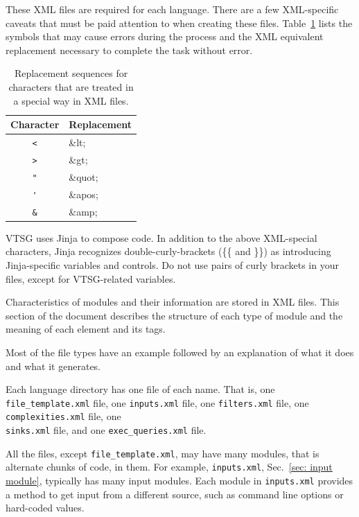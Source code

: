 These XML files are required for each language.
There 
are a few XML-specific caveats that must be paid attention to when 
creating these files. 
Table~\ref{tab:XML escapes} lists the symbols that may cause errors 
during the process and the XML equivalent replacement necessary to 
complete the
task without error.

\begin{table}[H]
\centering
\caption{Replacement sequences for characters that are treated 
in a special way in XML files.}
\begin{tabular}{|c|l|}
\hline
\textbf{Character} & \textbf{Replacement} \\
\hline
 \verb|<| & \&lt; \\
\hline
 \verb|>| & \&gt; \\
\hline
 \verb|"| & \&quot; \\
\hline
 \verb|'| & \&apos; \\
\hline
 \verb|&| & \&amp; \\
\hline
\end{tabular}
\label{tab:XML escapes}
\end{table}

VTSG uses Jinja to compose code. In addition to the above XML-special characters,
Jinja recognizes
double-curly-brackets (\{\{ and \}\}) as introducing Jinja-specific variables and
controls.  Do not use pairs of curly brackets in your files, except for VTSG-related
variables.

Characteristics of modules and their information are stored in 
XML files.  
This section of the document describes the structure of each type of module and
the meaning
of each element and its tags.

Most of the file types have an example followed by
an explanation of what it does and what it generates.

Each language directory has one file of each name. That is,
one \verb|file_template.xml| file, one \verb|inputs.xml| file,
one \verb|filters.xml| file, one \verb|complexities.xml| file,
one \\ \verb|sinks.xml| file, and one \verb|exec_queries.xml| file.

All the files, except \verb|file_template.xml|, may have many
modules, that is alternate chunks of code, in them.
For example, \verb|inputs.xml|, Sec.~\ref{sec: input module}, typically has many input
modules.  Each module in \verb|inputs.xml| provides a method to get input from a
different source, such as command line options or hard-coded values.

